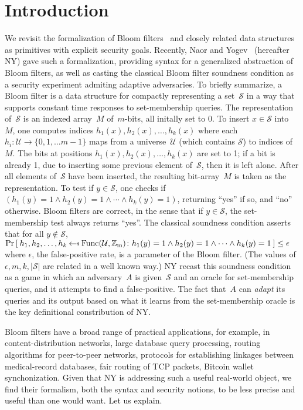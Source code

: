 \section{Introduction}
We revisit the formalization of Bloom filters~\cite{xxx} and closely related data structures as primitives with explicit security goals.  Recently, Naor and Yogev~\cite{xxx} (hereafter NY) gave such a formalization, providing syntax for a generalized abstraction of Bloom filters, as well as casting the classical Bloom filter soundness condition as a security experiment admiting adaptive adversaries.  To briefly summarize, a Bloom filter is a data structure for compactly representing a set~$\mathcal{S}$ in a way that supports constant time responses to set-membership queries.  The representation of~$\mathcal{S}$ is an indexed array~$M$ of~$m$-bits, all initally set to 0.  To insert $x \in \mathcal{S}$ into~$M$, one computes indices $h_1(x),h_2(x),\ldots,h_k(x)$ where each $h_i \colon \mathcal{U} \to \{0,1,\ldots m-1\}$ maps from a universe~$\mathcal{U}$ (which contains $\mathcal{S}$) to indices of~$M$.  The bits at positions $h_1(x),h_2(x),\ldots,h_k(x)$ are set to 1; if a bit is already 1, due to inserting some previous element of~$\mathcal{S}$, then it is left alone.  After all elements of~$\mathcal{S}$ have been inserted, the resulting bit-array~$M$ is taken as the representation.  To test if $y \in \mathcal{S}$, one checks if  $(h_1(y)=1 \wedge h_2(y)=1 \wedge \cdots \wedge h_k(y)=1)$, returning ``yes'' if so, and ``no'' otherwise.   Bloom filters are correct, in the sense that if $y \in \mathcal{S}$, the set-membership test always returns ``yes''.  The classical soundness condition asserts that for all $y \notin\mathcal{S}$,  $\Prob{h_1,h_2,\ldots,h_k \getsr \mathrm{Func(\mathcal{U},\mathbb{Z}_m)}\colon h_1(y)=1 \wedge h_2(y)=1 \wedge \cdots \wedge h_k(y)=1} \leq \epsilon$ where $\epsilon$, the false-positive rate, is a parameter of the Bloom filter.  (The values of~$\epsilon,m,k,|\mathcal{S}|$ are related in a well known way.)  NY recast this soundness condition as a game in which an adversary~$A$ is given~$\mathcal{S}$ and an oracle for set-membership queries, and it attempts to find a false-positive.  The fact that~$A$ can \emph{adapt} its queries and its output based on what it learns from the set-membership oracle is the key definitional constribution of NY.

Bloom filters have a broad range of practical applications, for example, in content-distribution networks, large database query processing, routing algorithms for peer-to-peer networks, protocols for establishing linkages between medical-record databases, fair routing of TCP packets, Bitcoin wallet synchonization.   Given that NY is addressing such a useful real-world object, we find their formalism, both the syntax and security notions, to be less precise and useful than one would want.  Let us explain.

